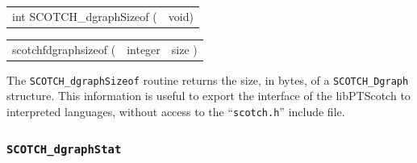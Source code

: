 \begin{itemize}
\progsyn

{\tt\begin{tabular}{l@{}l}
int SCOTCH\_dgraphSizeof ( & void)
\end{tabular}}

{\tt\begin{tabular}{l@{}ll}
scotchfdgraphsizeof ( & integer & size )
\end{tabular}}

\progdes

The {\tt SCOTCH\_dgraphSizeof} routine returns the size, in bytes, of a
{\tt SCOTCH\_\lbt Dgraph} structure. This information is useful to
export the interface of the {\sc libPTScotch} to interpreted languages,
without access to the ``{\tt scotch.h}'' include file.
\end{itemize}

\subsubsection{{\tt SCOTCH\_dgraphStat}}
\label{sec-lib-func-dgraphstat}

